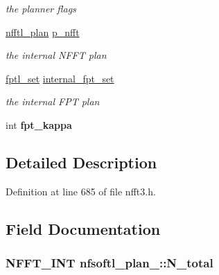 \begin{DoxyCompactItemize}
\begin{DoxyCompactList}\small\item\em the planner flags \end{DoxyCompactList}\item 
\hypertarget{structnfsoftl__plan___ac1230a81665ed7aa68cb7b4bc3a0c0c1}{\hyperlink{structnfftl__plan}{nfftl\-\_\-plan} \hyperlink{structnfsoftl__plan___ac1230a81665ed7aa68cb7b4bc3a0c0c1}{p\-\_\-nfft}}\label{structnfsoftl__plan___ac1230a81665ed7aa68cb7b4bc3a0c0c1}

\begin{DoxyCompactList}\small\item\em the internal N\-F\-F\-T plan \end{DoxyCompactList}\item 
\hypertarget{structnfsoftl__plan___a8cf750d58de22209962bd9cb96f48864}{\hyperlink{nfft3_8h_afa0a822edf2abbd8e1ab2cd0afd72efa}{fptl\-\_\-set} \hyperlink{structnfsoftl__plan___a8cf750d58de22209962bd9cb96f48864}{internal\-\_\-fpt\-\_\-set}}\label{structnfsoftl__plan___a8cf750d58de22209962bd9cb96f48864}

\begin{DoxyCompactList}\small\item\em the internal F\-P\-T plan \end{DoxyCompactList}\item 
\hypertarget{structnfsoftl__plan___a5738717c7006e1756863debb43395d5a}{int {\bfseries fpt\-\_\-kappa}}\label{structnfsoftl__plan___a5738717c7006e1756863debb43395d5a}

\end{DoxyCompactItemize}


\subsection{Detailed Description}


Definition at line 685 of file nfft3.\-h.



\subsection{Field Documentation}
\hypertarget{structnfsoftl__plan___aa0655ed287e448f93827572cec3c90c9}{
\subsubsection[{N\-\_\-total}]{\setlength{\rightskip}{0pt plus 5cm}N\-F\-F\-T\-\_\-\-I\-N\-T nfsoftl\-\_\-plan\-\_\-\-::\-N\-\_\-total}}\label{structnfsoftl__plan___aa0655ed287e448f93827572cec3c90c9}



